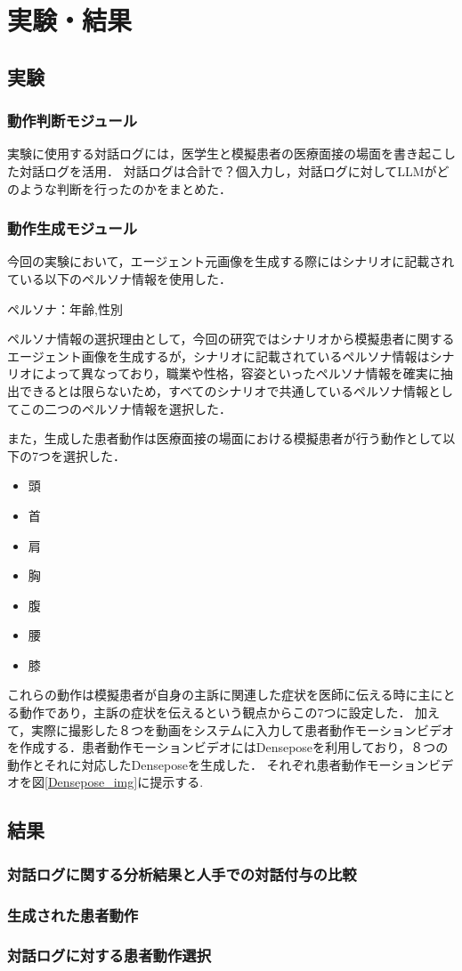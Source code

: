 \section{実験・結果}\label{result}

\subsection{実験}
\subsubsection*{動作判断モジュール}
実験に使用する対話ログには，医学生と模擬患者の医療面接の場面を書き起こした対話ログを活用．
対話ログは合計で？個入力し，対話ログに対してLLMがどのような判断を行ったのかをまとめた．

\subsubsection*{動作生成モジュール}
今回の実験において，エージェント元画像を生成する際にはシナリオに記載されている以下のペルソナ情報を使用した．
\centerline{ペルソナ：年齢,性別}

ペルソナ情報の選択理由として，今回の研究ではシナリオから模擬患者に関するエージェント画像を生成するが，シナリオに記載されているペルソナ情報はシナリオによって異なっており，職業や性格，容姿といったペルソナ情報を確実に抽出できるとは限らないため，すべてのシナリオで共通しているペルソナ情報としてこの二つのペルソナ情報を選択した．


また，生成した患者動作は医療面接の場面における模擬患者が行う動作として以下の7つを選択した．
 \begin{itemize}
  \item 頭
  \item 首
  \item 肩
  \item 胸
  \item 腹
  \item 腰
  \item 膝
 \end{itemize}
これらの動作は模擬患者が自身の主訴に関連した症状を医師に伝える時に主にとる動作であり，主訴の症状を伝えるという観点からこの7つに設定した．
加えて，実際に撮影した８つを動画をシステムに入力して患者動作モーションビデオを作成する．患者動作モーションビデオにはDenseposeを利用しており，８つの動作とそれに対応したDenseposeを生成した．
それぞれ患者動作モーションビデオを図\ref{Densepose_img}に提示する. 

\subsection{結果}
\subsubsection*{対話ログに関する分析結果と人手での対話付与の比較}

\subsubsection*{生成された患者動作}

\subsubsection*{対話ログに対する患者動作選択}
